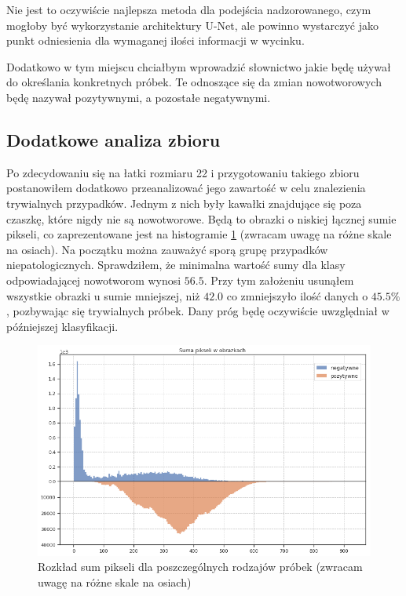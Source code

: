 Nie jest to oczywiście najlepsza metoda dla podejścia nadzorowanego, czym mogłoby być wykorzystanie architektury U-Net, ale powinno wystarczyć jako punkt odniesienia dla wymaganej ilości informacji w wycinku.

Dodatkowo w tym miejscu chciałbym wprowadzić słownictwo jakie będę używał do określania konkretnych próbek. Te odnoszące się da zmian nowotworowych będę nazywał pozytywnymi, a pozostałe negatywnymi.

\subsection{Dodatkowe analiza zbioru}

Po zdecydowaniu się na łatki rozmiaru 22 i przygotowaniu takiego zbioru postanowiłem dodatkowo przeanalizować jego zawartość w celu znalezienia trywialnych przypadków. Jednym z nich były kawałki znajdujące się poza czaszkę, które nigdy nie są nowotworowe. Będą to obrazki o niskiej łącznej sumie pikseli, co zaprezentowane jest na histogramie \ref{fig:pixel_sums} (zwracam uwagę na różne skale na osiach). Na początku można zauważyć sporą grupę przypadków niepatologicznych. Sprawdziłem, że minimalna wartość sumy dla klasy odpowiadającej nowotworom wynosi $56.5$. Przy tym założeniu usunąłem wszystkie obrazki u sumie mniejszej, niż $42.0$ co zmniejszyło ilość danych o $45.5\%$, pozbywając się trywialnych próbek. Dany próg będę oczywiście uwzględniał w późniejszej klasyfikacji.

\begin{figure}[h!]
    \centering
    \includegraphics[width=1.0\textwidth]{images/pixel_sums_v2}
    \caption{Rozkład sum pikseli dla poszczególnych rodzajów próbek (zwracam uwagę na różne skale na osiach)}
    \label{fig:pixel_sums}
\end{figure}
